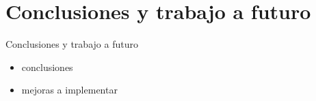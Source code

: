 \documentclass[]{beamer}
\begin{document}
\section{Conclusiones y trabajo a futuro}
\begin{frame}{Conclusiones y trabajo a futuro}
    \begin{itemize}
        \item conclusiones
        \item mejoras a implementar
    \end{itemize}
\end{frame}
\end{document}
